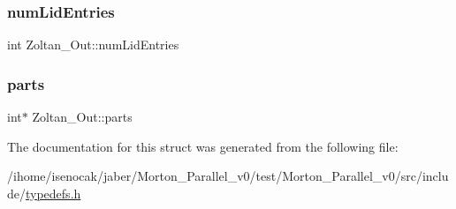 \subsubsection{\texorpdfstring{num\+Lid\+Entries}{numLidEntries}}
{\footnotesize\ttfamily int Zoltan\+\_\+\+Out\+::num\+Lid\+Entries}

\mbox{\label{structZoltan__Out_addc3ad3c22e6fb8e7073de71425d4ead}} 
\subsubsection{\texorpdfstring{parts}{parts}}
{\footnotesize\ttfamily int$\ast$ Zoltan\+\_\+\+Out\+::parts}



The documentation for this struct was generated from the following file\+:\begin{DoxyCompactItemize}
\item 
/ihome/isenocak/jaber/\+Morton\+\_\+\+Parallel\+\_\+v0/test/\+Morton\+\_\+\+Parallel\+\_\+v0/src/include/\mbox{\hyperlink{typedefs_8h}{typedefs.\+h}}\end{DoxyCompactItemize}
